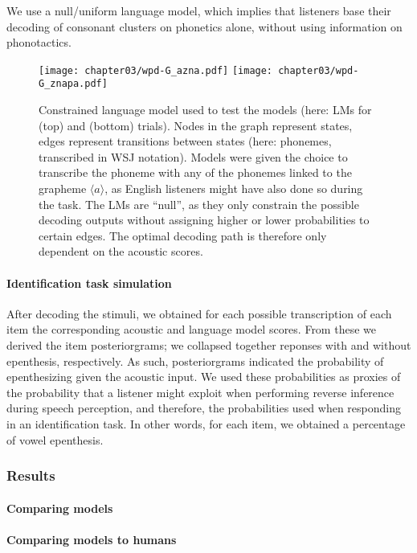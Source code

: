 We use a null/uniform language model, which implies that listeners base their decoding of consonant clusters on phonetics alone, without using information on phonotactics.

\begin{figure*}[htb]
\centering
\texttt{[image: chapter03/wpd-G\_azna.pdf]}
\vspace{0.5cm}
\texttt{[image: chapter03/wpd-G\_znapa.pdf]}
\caption{Constrained language model used to test the models (here: LMs for  (top) and  (bottom) trials). Nodes in the graph represent states, edges represent transitions between states (here: phonemes, transcribed in WSJ notation). Models were given the choice to transcribe the phoneme  with any of the phonemes linked to the grapheme $\langle a \rangle$, as English listeners might have also done so during the task. The LMs are ``null'', as they only constrain the possible decoding outputs without assigning higher or lower probabilities to certain edges. The optimal decoding path is therefore only dependent on the acoustic scores.}
\label{fig:wpd_G}
\end{figure*}


\paragraph{Identification task simulation}
After decoding the stimuli, we obtained for each possible transcription of each item the corresponding acoustic and language model scores. From these we derived the item posteriorgrams; we collapsed together reponses with and without epenthesis, respectively. As such, posteriorgrams indicated the probability of epenthesizing \textipa{[@]} given the acoustic input. We used these probabilities as proxies of the probability that a listener might exploit when performing reverse inference during speech perception, and therefore, the probabilities used when responding in an identification task. In other words, for each item, we obtained a percentage of vowel epenthesis.

\subsubsection{Results}
\paragraph{Comparing models}
\paragraph{Comparing models to humans}
